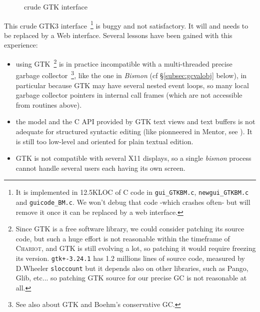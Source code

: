 \begin{figure}[h]
  \begin{center}
  \end{center}
  \caption{crude {} GTK interface
    {}}
  \label{fig:bismonscreenshot-cbdcf}
\end{figure}

This crude GTK3 interface~\footnote{It is implemented in 12.5KLOC of C
  code in \texttt{gui\_GTKBM.c}, \texttt{newgui\_GTKBM.c} and
  \texttt{guicode\_BM.c}. We won't debug that code -which crashes
  often- but will remove it once it can be replaced by a web
  interface.} is buggy and not satisfactory. It will and needs to be
replaced by a Web interface. Several lessons have been gained with
this experience:

\begin{itemize}
\item using GTK~\footnote{Since GTK is a free software library, we
  could consider patching its source code, but such a huge effort is
  not reasonable within the timeframe of \textsc{Chariot}, and GTK is
  still evolving a lot, so patching it would require freezing its
  version. \texttt{gtk+-3.24.1} has 1.2 millions lines of source code,
  measured by D.Wheeler \texttt{sloccount} but it depends also on
  other libraries, such as Pango, Glib, etc... so patching GTK source
  for our precise GC is not reasonable at all.}  is in practice
  incompatible with a multi-threaded precise garbage
  collector~\footnote{See also
     about GTK and
    Boehm's conservative GC.}, like the one in \emph{Bismon} (cf
  §\ref{subsec:gcvalobj} below), in particular because GTK may have
  several nested event loops, so many local garbage collector pointers
  in internal call frames (which are not accessible from routines
  above).

    \item the model and the C API provided by GTK text views and text
      buffers is not adequate for structured syntactic editing (like
      pionneered in Mentor, see \cite{donzeaugouge:inria-mentor}). It is still too low-level and oriented for plain textual edition.

      \item GTK is not compatible with several X11 displays, so a
        single \emph{bismon} process cannot handle several users each
        having its own screen.
\end{itemize}

